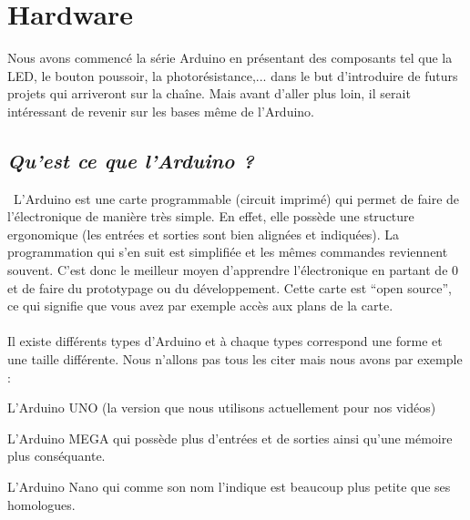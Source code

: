\documentclass[12pt,a4paper]{article}
\begin{document}
\newpage
\section{\LARGE Hardware}
Nous avons commencé la série Arduino en présentant des composants tel que la LED, le bouton poussoir, la photorésistance,... dans le but d’introduire de futurs projets qui arriveront sur la chaîne. Mais avant d’aller plus loin, il serait intéressant de revenir sur les bases même de l’Arduino.

\subsection{\textit{\textbf{Qu’est ce que l’Arduino ?}}}
\
L’Arduino est une carte programmable (circuit imprimé)  qui permet de faire de l'électronique de manière très simple. En effet, elle possède une structure ergonomique (les entrées et sorties sont bien alignées et indiquées). La programmation qui s’en suit est simplifiée et les mêmes commandes reviennent souvent. C’est donc le meilleur moyen d’apprendre l’électronique en partant de 0 et de faire du prototypage ou du développement. Cette carte est “open source”, ce qui signifie que vous avez par exemple accès aux plans de la carte.
\\
\\
Il existe différents types d’Arduino et à chaque types correspond une forme et une taille différente.
Nous n’allons pas tous les citer mais nous avons par exemple : 
\begin{compactitem}

\item L'Arduino UNO (la version que nous utilisons actuellement pour nos vidéos) 
\\
\item L’Arduino MEGA qui possède plus d’entrées et de sorties ainsi qu'une mémoire plus conséquante.
\\
\item L’Arduino Nano qui comme son nom l’indique est beaucoup plus petite que ses homologues.
\end{compactitem}
\end{document}
